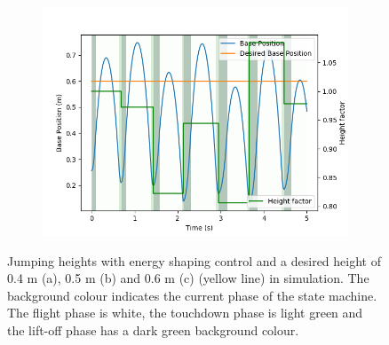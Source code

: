 \documentclass[onecolumn, letter paper]{report}
\begin{document}
\begin{figure}[htb!]
\begin{subfigure}{.49\textwidth}
    \includegraphics[width=\textwidth]{figures/sim0.6m/base_position.png}
    \end{subfigure}
    \caption{Jumping heights with energy shaping control and a desired height of 0.4 m (a), 0.5 m (b) and 0.6 m (c) (yellow line) in simulation. The background colour indicates the current phase of the state machine. The flight phase is white, the touchdown phase is light green and the lift-off phase has a dark green background colour.}
    \label{fig:simheight}
\end{figure}
\end{document}
